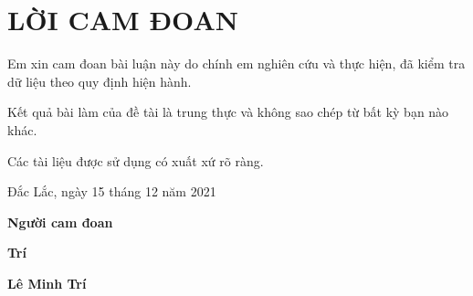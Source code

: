 \section*{LỜI CAM ĐOAN}
\thispagestyle{empty}
Em xin cam đoan bài luận này do chính em nghiên cứu và thực hiện, đã kiểm tra dữ liệu theo quy định hiện hành.

Kết quả bài làm của đề tài là trung thực và không sao chép từ bất kỳ bạn nào khác.

Các tài liệu được sử dụng có xuất xứ rõ ràng.
\vspace{1.5cm}

\hspace{7cm} Đắc Lắc, ngày 15 tháng 12 năm 2021

\hspace{9cm}\textbf{Người cam đoan}

\hspace{10.2cm} \textbf{Trí}

\hspace{9.5cm}\textbf{Lê Minh Trí}
\clearpage